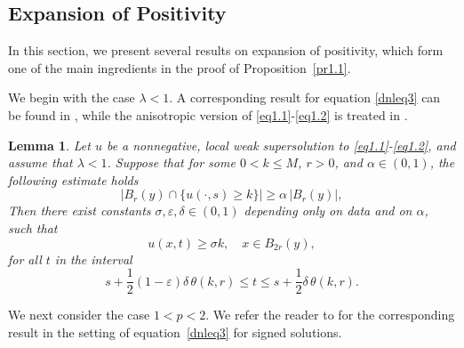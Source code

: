 \documentclass[a4paper,11pt,fullpage]{article}
\numberwithin{equation}{section}
\newtheorem{lemma}{Lemma}[section]
\begin{document}
\subsection{Expansion of Positivity}

In this section, we present several results on expansion of positivity, which form one of the main ingredients in the proof of Proposition~\ref{pr1.1}.

We begin with the case $\lambda<1$. A corresponding result for equation \eqref{dnleq3} can be found in \cite[Proposition~4.3]{Hen2022}, while the anisotropic version of \eqref{eq1.1}-\eqref{eq1.2} is treated in \cite[Theorem~3.4]{CiaHenSavSkr2025-1}.

\begin{lemma}\label{lem3.3}
Let $u$ be a nonnegative, local weak supersolution to \eqref{eq1.1}-\eqref{eq1.2}, and assume that $\lambda<1$. Suppose that for some $0<k\leqslant M$, $r>0$, and $\alpha\in(0,1)$, the following estimate holds
\begin{equation}\label{eq3.5}
|B_r(y)\cap\{u(\cdot, s) \geqslant k\}| \geqslant \alpha\, |B_r(y)|,
\end{equation}
Then there exist constants $\sigma, \varepsilon, \delta \in (0,1)$
depending only on data and on $\alpha$, such that
\begin{equation}\label{eq3.6}
u(x, t)\geqslant\sigma k,\quad x\in B_{2r}(y),
\end{equation}
for all $t$ in the interval
\begin{equation}\label{eq3.7}
s+\frac{1}{2}(1-\varepsilon)\delta\,\theta(k, r)\leqslant t\leqslant s+\frac{1}{2}\delta\,\theta(k, r).
\end{equation}
\end{lemma}

We next consider the case $1<p<2$. We refer the reader to \cite[Lemma~3.4]{NaS22} for the corresponding result in the setting of equation~\eqref{dnleq3} for signed solutions.
\end{document}
